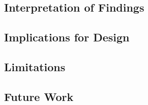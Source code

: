 \subsection{Interpretation of Findings}

\subsection{Implications for Design}

\subsection{Limitations}

\subsection{Future Work}